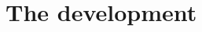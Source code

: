 {%



\section{The development}
}
\newcommand{\CONCLUSION}{%
  Q.E.D.
  \par
  \paragraph*{Acknowledgments.}
  \GENERATED


}



